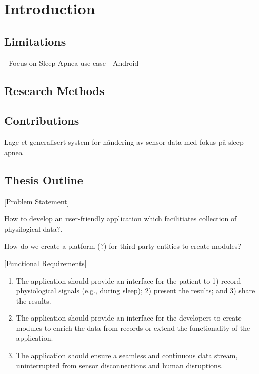 \chapter{Introduction}\label{introduction}




\section{Limitations}
- Focus on Sleep Apnea use-case 
- Android
- 

\section{Research Methods}
\section{Contributions}
Lage et generalisert system for håndering av sensor data med fokus på sleep apnea

\section{Thesis Outline}

[Problem Statement]

How to develop an user-friendly application which facilitiates collection of physilogical data?. 

How do we create a platform (?) for third-party entities to create modules?

[Functional Requirements]
\begin{enumerate}
    \item The application should provide an interface for the patient to 1) record physiological signals (e.g., during sleep); 2) present the results; and 3) share the results.
    \item The application should provide an interface for the developers to create modules to enrich the data from records or extend the functionality of the application. 
    \item The application should ensure a seamless and continuous data stream, uninterrupted from sensor disconnections and human disruptions.
\end{enumerate}
